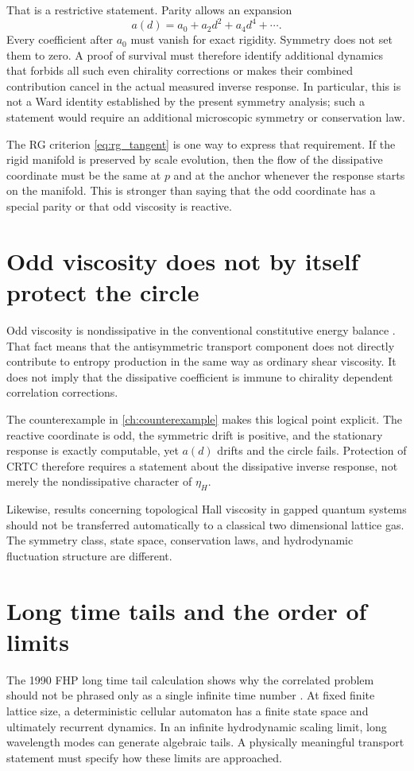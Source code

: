 That is a restrictive statement. Parity allows an expansion
\begin{equation}
 a(d)=a_0+a_2d^2+a_4d^4+\cdots.
 \label{eq:discussion_even_drift}
\end{equation}
Every coefficient after $a_0$ must vanish for exact rigidity. Symmetry does not set them to zero. A proof of survival must therefore identify additional dynamics that forbids all such even chirality corrections or makes their combined contribution cancel in the actual measured inverse response. In particular, this is not a Ward identity established by the present symmetry analysis; such a statement would require an additional microscopic symmetry or conservation law.

The RG criterion \cref{eq:rg_tangent} is one way to express that requirement. If the rigid manifold is preserved by scale evolution, then the flow of the dissipative coordinate must be the same at $p$ and at the anchor whenever the response starts on the manifold. This is stronger than saying that the odd coordinate has a special parity or that odd viscosity is reactive.

\section{Odd viscosity does not by itself protect the circle}
Odd viscosity is nondissipative in the conventional constitutive energy balance \cite{Avron1998,Banerjee2017}. That fact means that the antisymmetric transport component does not directly contribute to entropy production in the same way as ordinary shear viscosity. It does not imply that the dissipative coefficient is immune to chirality dependent correlation corrections.

The counterexample in \cref{ch:counterexample} makes this logical point explicit. The reactive coordinate is odd, the symmetric drift is positive, and the stationary response is exactly computable, yet $a(d)$ drifts and the circle fails. Protection of CRTC therefore requires a statement about the dissipative inverse response, not merely the nondissipative character of $\eta_H$.

Likewise, results concerning topological Hall viscosity in gapped quantum systems should not be transferred automatically to a classical two dimensional lattice gas. The symmetry class, state space, conservation laws, and hydrodynamic fluctuation structure are different.

\section{Long time tails and the order of limits}
The 1990 FHP long time tail calculation shows why the correlated problem should not be phrased only as a single infinite time number \cite{Naitoh1990}. At fixed finite lattice size, a deterministic cellular automaton has a finite state space and ultimately recurrent dynamics. In an infinite hydrodynamic scaling limit, long wavelength modes can generate algebraic tails. A physically meaningful transport statement must specify how these limits are approached.

